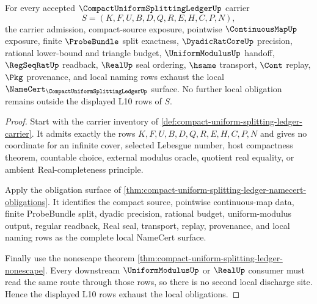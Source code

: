 \begin{theorem}
\label{thm:compact-uniform-splitting-ledger-obligation-exhaustion}
For every accepted $\CompactUniformSplittingLedgerUp$ carrier
$$
S=(K,F,U,B,D,Q,R,E,H,C,P,N),
$$
the carrier admission, compact-source exposure, pointwise $\ContinuousMapUp$ exposure, finite $\ProbeBundle$ split exactness, $\DyadicRatCoreUp$ precision, rational lower-bound and triangle budget, $\UniformModulusUp$ handoff, $\RegSeqRatUp$ readback, $\RealUp$ seal ordering, $\hsame$ transport, $\Cont$ replay, $\Pkg$ provenance, and local naming rows exhaust the local $\NameCert_{\CompactUniformSplittingLedgerUp}$ surface. No further local obligation remains outside the displayed L10 rows of $S$.
\end{theorem}
\begin{proof}
Start with the carrier inventory of \autoref{def:compact-uniform-splitting-ledger-carrier}. It admits exactly the rows $K,F,U,B,D,Q,R,E,H,C,P,N$ and gives no coordinate for an infinite cover, selected Lebesgue number, host compactness theorem, countable choice, external modulus oracle, quotient real equality, or ambient Real-completeness principle.

Apply the obligation surface of \autoref{thm:compact-uniform-splitting-ledger-namecert-obligations}. It identifies the compact source, pointwise continuous-map data, finite ProbeBundle split, dyadic precision, rational budget, uniform-modulus output, regular readback, Real seal, transport, replay, provenance, and local naming rows as the complete local NameCert surface.

Finally use the nonescape theorem \autoref{thm:compact-uniform-splitting-ledger-nonescape}. Every downstream $\UniformModulusUp$ or $\RealUp$ consumer must read the same route through those rows, so there is no second local discharge site. Hence the displayed L10 rows exhaust the local obligations.
\end{proof}



